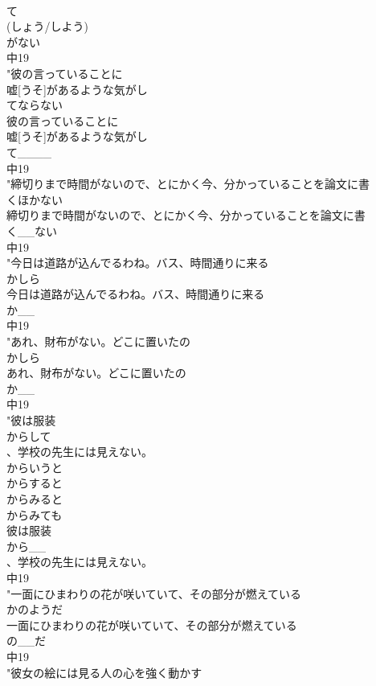 \documentclass[8pt]{extreport}
\begin{document}
\begin{CJK}{UTF8}{min}
\\	て
\\	(しょう/しよう)
\\	がない
\\	中19
\\	"彼の言っていることに
\\	嘘[うそ]があるような気がし
\\	てならない
\\	彼の言っていることに
\\	嘘[うそ]があるような気がし
\\	て____
\\	中19
\\	"締切りまで時間がないので、とにかく今、分かっていることを論文に書
\\	くほかない
\\	締切りまで時間がないので、とにかく今、分かっていることを論文に書
\\	く__ない
\\	中19
\\	"今日は道路が込んでるわね。バス、時間通りに来る
\\	かしら
\\	今日は道路が込んでるわね。バス、時間通りに来る
\\	か__
\\	中19
\\	"あれ、財布がない。どこに置いたの
\\	かしら
\\	あれ、財布がない。どこに置いたの
\\	か__
\\	中19
\\	"彼は服装
\\	からして
\\	、学校の先生には見えない。 
\\	からいうと
\\	からすると
\\	からみると
\\	からみても
\\	彼は服装
\\	から__
\\	、学校の先生には見えない。
\\	中19
\\	"一面にひまわりの花が咲いていて、その部分が燃えている
\\	かのようだ
\\	一面にひまわりの花が咲いていて、その部分が燃えている
\\	の__だ
\\	中19
\\	"彼女の絵には見る人の心を強く動かす

\end{CJK}
\end{document}
